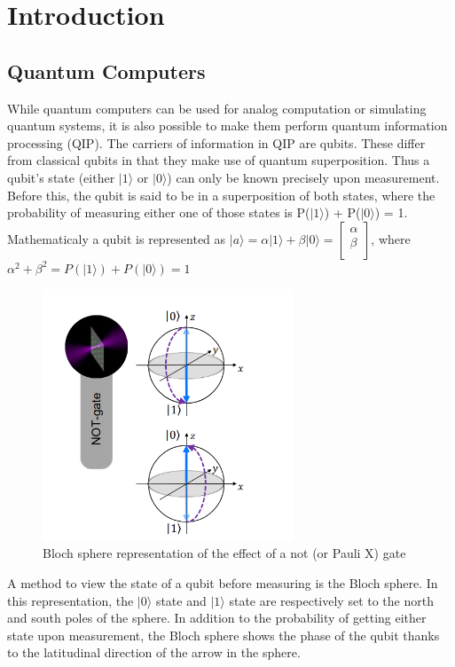 \section{Introduction}
\label{sec:intro}


\subsection{Quantum Computers}
\label{sec:QC}
While quantum computers can be used for analog computation or simulating quantum systems, %
it is also possible to make them perform quantum information processing (QIP). The carriers of information in QIP are qubits. These differ from classical qubits
in that they make use of quantum superposition. Thus a qubit's state (either $|1 \rangle$ or $|0 \rangle$) can only be known precisely upon measurement. Before this,
the qubit is said to be in a superposition of both states, where the probability of measuring either one of those states is P($|1 \rangle$) + P($|0 \rangle$) = 1.
Mathematicaly a qubit is represented as $ |a \rangle = \alpha|1 \rangle + \beta|0 \rangle =  \begin{bmatrix}
    \alpha \\
    \beta \\
\end{bmatrix}$, where $\alpha^2 + \beta^2 = P(|1 \rangle) + P(|0 \rangle) = 1$

\begin{figure}
  \centering
  \includegraphics[width=75mm]{./Images/BlochNotGate.png}
  \caption{Bloch sphere representation of the effect of a not (or Pauli X) gate \cite{henrietQuantumComputingNeutral2020}} 
  \label{fig:BlockNotGate}

\end{figure}
A method to view the state of a qubit before measuring is the Bloch sphere. 
In this representation, the  $|0 \rangle$ state and $|1 \rangle$ state are respectively set to the north and south poles of the sphere. In addition to the 
probability of getting either state upon measurement, the Bloch sphere shows the phase of the qubit thanks to the latitudinal direction of the arrow in the sphere.

